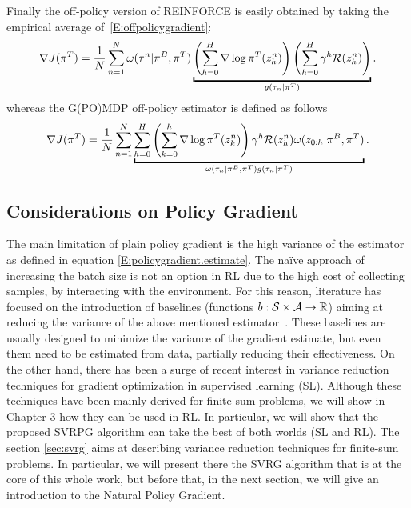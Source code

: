 Finally the off-policy version of REINFORCE is easily obtained by taking the empirical average of~\eqref{E:offpolicygradient}:
\[
\nabla J(\pi^T) = \frac{1}{N} \sum_{n=1}^{N} \omega(\tau^n|\pi^B, \pi^T)
\underbracket{
	\left(\sum_{h=0}^{H} \nabla \log \pi^{T}(z_h^n) \right)\left(\sum_{h=0}^{H}\gamma^h \Reward(z_h^n)\right)
}_{g(\tau_n|\pi^T)}.
\]
%
whereas the G(PO)MDP off-policy estimator is defined as follows
\[
\nabla J(\pi^T) = \frac{1}{N} \sum_{n=1}^{N}
\underbracket{
	\sum_{h=0}^H \left(\sum_{k=0}^h \nabla \log\pi^T(z_k^n)\right) \gamma^h \Reward(z_h^n) \omega(z_{0:h}|\pi^B,\pi^T)
}_{\omega(\tau_n|\pi^B,\pi^T)g(\tau_n|\pi^T)}.
\]
\subsection{Considerations on Policy Gradient}
The main limitation of plain policy gradient is the high variance of the estimator as defined in equation \ref{E:policygradient.estimate}.
The na\"ive approach of increasing the batch size is not an option in \acs{RL} due to the high cost of collecting samples, \ie by interacting with the environment.
For this reason, literature has focused on the introduction of baselines (\ie functions $b : \mathcal{S} \times \mathcal{A} \to \mathbb R$) aiming at reducing the variance of the above mentioned estimator~\citep[\eg][]{williams1992simple,Peters2008reinf,Thomas2017actionbaseline,wu2018variance}.
These baselines are usually designed to minimize the variance of the gradient estimate, but even them need to be estimated from data, partially reducing their effectiveness.
On the other hand, there has been a surge of recent interest in variance reduction techniques for gradient optimization in supervised learning (\acs{SL}).
Although these techniques have been mainly derived for finite-sum problems, we will show in \hyperref[chap:svrpg]{Chapter 3} how they can be used in \acs{RL}.
In particular, we will show that the proposed \acs{SVRPG} algorithm can take the best of both worlds (\ie \acs{SL} and \acs{RL}).
The section \ref{sec:svrg} aims at describing variance reduction techniques for finite-sum problems. In particular, we will present there the \acs{SVRG} algorithm that is at the core of this whole work, but before that, in the next section, we will give an introduction to the Natural Policy Gradient.


\vspace{-0.05in}
